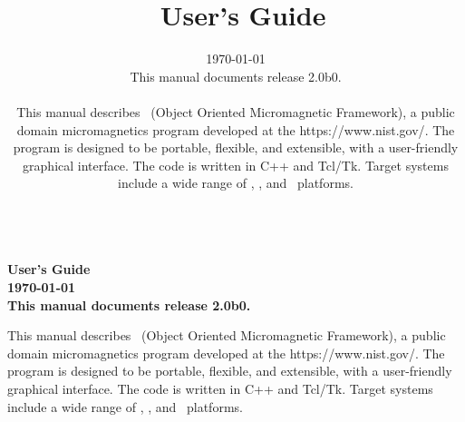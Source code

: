 \documentclass[12pt]{report}
\title{\OOMMF\ User's Guide}
\author{\today\\[1ex]
This manual documents release 2.0b0.\\[1ex]
\begin{flushleft} %
This manual describes \OOMMF\ (Object Oriented Micromagnetic Framework),
a public domain micromagnetics program developed at the
\htmladdnormallink{National Institute of Standards and Technology}
{https://www.nist.gov/}.  The program is designed
to be portable, flexible, and extensible, with a user-friendly graphical
interface.  The code is written in C++ and Tcl/Tk. Target systems
include a wide range of \Unix, \Windows, and \MacOSX\ platforms.
\end{flushleft}
}
\begin{document}
\notlatexmlonly{\nocite{*}}  %
\latexmlonly{\nocite{
gillette1958,   %
scheinfein1991, %
}}


\iflatexml
\maketitle
\else
\begin{titlepage}
\setcounter{page}{0}    %
\par
\vspace*{\fill}
\begin{center}
\Large\bf
\OOMMF\\
User's Guide\\[2ex]
\large
{\today}
{}\\[2ex]
This manual documents release 2.0b0.\\[1ex]
\end{center}
\vspace{7\baselineskip}
This manual describes \OOMMF\ (Object Oriented Micromagnetic Framework),
a public domain micromagnetics program developed at the
{https://www.nist.gov/}.  The program is designed
to be portable, flexible, and extensible, with a user-friendly graphical
interface.  The code is written in C++ and Tcl/Tk. Target systems
include a wide range of \Unix, \Windows, and \MacOSX\ platforms.
\vspace*{\fill}
\end{titlepage}
\fi
\end{document}
